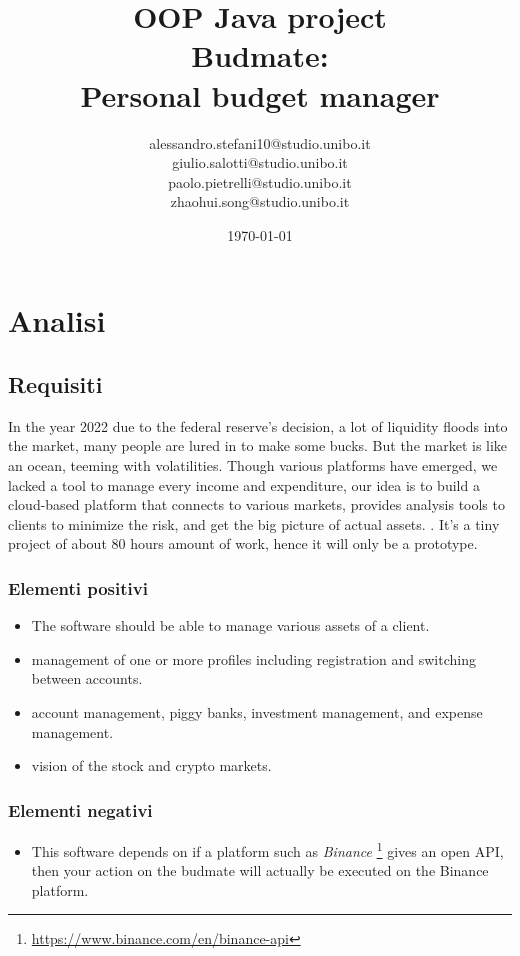 \documentclass[a4paper,12pt]{report}
\title{OOP Java project \\Budmate:\\ Personal budget manager}
\author{
    alessandro.stefani10@studio.unibo.it \\
    giulio.salotti@studio.unibo.it \\
    paolo.pietrelli@studio.unibo.it \\
    zhaohui.song@studio.unibo.it
}
\date{\today}
\begin{document}
\maketitle

\tableofcontents

\chapter{Analisi}

\section{Requisiti}

In the year 2022 due to the federal reserve's decision, a lot of liquidity floods into the market, many people are lured in to make some bucks.
But the market is like an ocean, teeming with volatilities. 
Though various platforms have emerged, we lacked a tool to manage every income and expenditure, our idea is to build a cloud-based platform that connects to various markets, provides analysis tools to clients to minimize the risk, and get the big picture of actual assets. .
It's a tiny project of about 80 hours amount of work, hence it will only be a prototype.

\subsection*{Elementi positivi}
\begin{itemize}
	\item The software should be able to manage various assets of a client.
	\item management of one or more profiles including registration and switching between accounts.
	\item account management, piggy banks, investment management, and expense management.
	\item vision of the stock and crypto markets.
\end{itemize}

\subsection*{Elementi negativi}
\begin{itemize}
	\item This software depends on if a platform such as \textit{Binance} \footnote{\url{https://www.binance.com/en/binance-api}} gives an open API, then your action on the budmate will actually be executed on the Binance platform.
\end{itemize}
\end{document}
